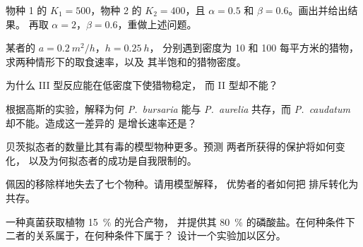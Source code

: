 \begin{exercise}[$\star\star$]\label{exo:b1:species-interactions:5}
物种 1 的 $K_1 = 500$，物种 2 的 $K_2 = 400$，且 $\alpha =
0.5$ 和 $\beta = 0.6$。画出并给出结果。
再取 $\alpha = 2$，$\beta = 0.6$，重做上述问题。
\end{exercise}

\begin{exercise}[$\star\star$]\label{exo:b1:species-interactions:6}
某者的 $a = \qty{0.2}{m^2/h}$，$h = \qty{0.25}{h}$，
分别遇到密度为 \qty{10}{} 和 \qty{100}{} 每平方米的猎物，
求两种情形下的取食速率，以及
其半饱和的猎物密度。
\end{exercise}

\begin{exercise}[$\star\star$]\label{exo:b1:species-interactions:7}
为什么 III 型反应能在低密度下使猎物稳定，
而 II 型却不能？
\end{exercise}

\begin{exercise}[$\star\star$]\label{exo:b1:species-interactions:8}
根据高斯的实验，解释为何 \emph{P.~bursaria} 能与
\emph{P.~aurelia} 共存，而 \emph{P.~caudatum} 却不能。造成这一差异的
是增长速率还是？
\end{exercise}

\begin{exercise}[$\star\star$]\label{exo:b1:species-interactions:9}
贝茨拟态者的数量比其有毒的模型物种更多。预测
两者所获得的保护将如何变化，
以及为何拟态者的成功是自我限制的。
\end{exercise}

\begin{exercise}[$\star\star\star$]\label{exo:b1:species-interactions:10}
佩因的移除样地失去了七个物种。请用模型解释，
优势者的者如何把
排斥转化为共存。
\end{exercise}

\begin{exercise}[$\star\star\star$]\label{exo:b1:species-interactions:11}
一种真菌获取植物 \qty{15}{\%} 的光合产物，
并提供其 \qty{80}{\%} 的磷酸盐。在何种条件下
二者的关系属于，在何种条件下属于？
设计一个实验加以区分。
\end{exercise}

